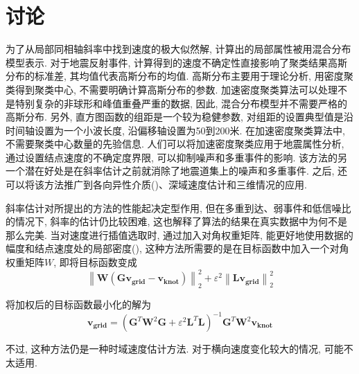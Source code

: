 \section{讨论}
为了从局部同相轴斜率中找到速度的极大似然解, 计算出的局部属性被用混合分布模型表示. 对于地震反射事件, 计算得到的速度不确定性直接影响了聚类结果高斯分布的标准差, 其均值代表高斯分布的均值. 高斯分布主要用于理论分析, 用密度聚类得到聚类中心, 不需要明确计算高斯分布的参数. 加速密度聚类算法可以处理不是特别复杂的非球形和峰值重叠严重的数据, 因此, 混合分布模型并不需要严格的高斯分布. 另外, 直方图函数的组距是一个较为稳健参数, 对组距的设置典型值是沿时间轴设置为一个小波长度, 沿偏移轴设置为50到200米. 在加速密度聚类算法中, 不需要聚类中心数量的先验信息. 人们可以将加速密度聚类应用于地震属性分析, 通过设置结点速度的不确定度界限, 可以抑制噪声和多重事件的影响. 该方法的另一个潜在好处是在斜率估计之前就消除了地震道集上的噪声和多重事件. 之后, 还可以将该方法推广到各向异性介质(\cite{Alkhalifah2000,Alkhalifah2000a,Casasanta2011})、深域速度估计和三维情况的应用. 

斜率估计对所提出的方法的性能起决定型作用, 但在多重到达、弱事件和低信噪比的情况下, 斜率的估计仍比较困难, 这也解释了算法的结果在真实数据中为何不是那么完美. 当对速度进行插值选取时, 通过加入对角权重矩阵, 能更好地使用数据的幅度和结点速度处的局部密度(\cite{Fomel2003}), 这种方法所需要的是在目标函数中加入一个对角权重矩阵$W$, 即将目标函数变成
\begin{equation}
    \left\|\mathbf{W}\left(\mathbf{G} \mathbf{v}_{\mathbf{g r i d}}-\mathbf{v}_{\mathbf{k n o t}}\right)\right\|_{2}^{2}+\varepsilon^{2}\left\|\mathbf{L} \mathbf{v}_{\mathbf{g r i d}}\right\|_{2}^{2}
\end{equation}

将加权后的目标函数最小化的解为
\begin{equation}
    \mathbf{v}_{\mathbf{g r i d}}=\left(\mathbf{G}^{T} \mathbf{W}^{2} \mathbf{G}+\varepsilon^{2} \mathbf{L}^{T} \mathbf{L}\right)^{-1} \mathbf{G}^{T} \mathbf{W}^{2} \mathbf{v}_{\mathbf{k n o t}}
\end{equation}

不过, 这种方法仍是一种时域速度估计方法. 对于横向速度变化较大的情况, 可能不太适用. 

